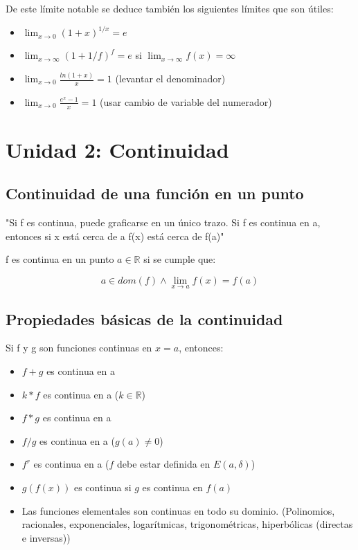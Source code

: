 \documentclass{report}
\begin{document}
		De este límite notable se deduce también los siguientes límites que son útiles:
		
		\begin{itemize}
			\item $\lim_{x \to 0} (1+x)^{1/x} = e$
			\item $\lim_{x \to \infty} (1+1/f)^f = e$ si $\lim_{x \to \infty}f(x)=\infty$
			\item $\lim_{x \to 0}\frac{ln(1+x)}{x} = 1$ (levantar el denominador)
			\item $\lim_{x \to 0}\frac{e^x-1}{x} = 1$ (usar cambio de variable del numerador)
		\end{itemize}
	
\chapter{Unidad 2: Continuidad}
	\section{Continuidad de una función en un punto}
		"Si f es continua, puede graficarse en un único trazo. Si f es continua en a, entonces si x está cerca de a f(x) está cerca de f(a)"
		
		f es continua en un punto $a \in \mathbb{R}$ si se cumple que:
		
		$$a \in dom(f) \wedge \lim_{x \to a} f(x)=f(a)$$
		
	\section{Propiedades básicas de la continuidad}
		Si f y g son funciones continuas en $x=a$, entonces:
		
		\begin{itemize}
			\item $f+g$ es continua en a
			\item $k*f$ es continua en a ($k \in \mathbb{R}$)
			\item $f*g$ es continua en a
			\item $f/g$ es continua en a ($g(a) \neq 0$)
			\item $f^r$ es continua en a ($f$ debe estar definida en $E(a, \delta)$)
			\item $g(f(x))$ es continua si $g$ es continua en $f(a)$
			\item Las funciones elementales son continuas en todo su dominio. (Polinomios, racionales, exponenciales, logarítmicas, trigonométricas, hiperbólicas (directas e inversas))
		\end{itemize}
	
\end{document}
